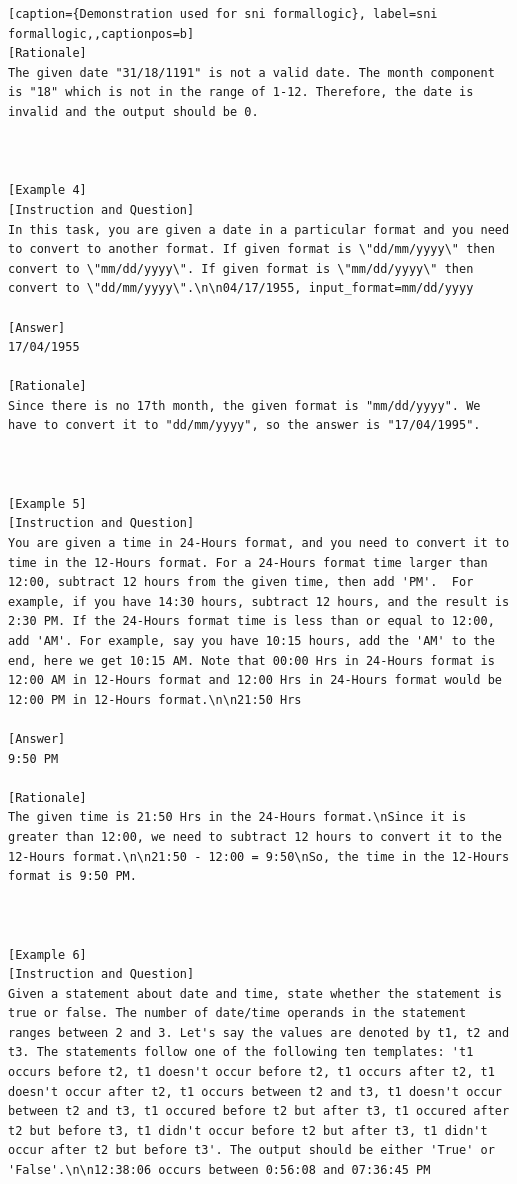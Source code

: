 \begin{lstlisting}[caption={Demonstration used for sni formallogic}, label=sni formallogic,,captionpos=b]
[Rationale]
The given date "31/18/1191" is not a valid date. The month component is "18" which is not in the range of 1-12. Therefore, the date is invalid and the output should be 0.



[Example 4]
[Instruction and Question]
In this task, you are given a date in a particular format and you need to convert to another format. If given format is \"dd/mm/yyyy\" then convert to \"mm/dd/yyyy\". If given format is \"mm/dd/yyyy\" then convert to \"dd/mm/yyyy\".\n\n04/17/1955, input_format=mm/dd/yyyy

[Answer]
17/04/1955

[Rationale]
Since there is no 17th month, the given format is "mm/dd/yyyy". We have to convert it to "dd/mm/yyyy", so the answer is "17/04/1995".



[Example 5]
[Instruction and Question]
You are given a time in 24-Hours format, and you need to convert it to time in the 12-Hours format. For a 24-Hours format time larger than 12:00, subtract 12 hours from the given time, then add 'PM'.  For example, if you have 14:30 hours, subtract 12 hours, and the result is 2:30 PM. If the 24-Hours format time is less than or equal to 12:00, add 'AM'. For example, say you have 10:15 hours, add the 'AM' to the end, here we get 10:15 AM. Note that 00:00 Hrs in 24-Hours format is 12:00 AM in 12-Hours format and 12:00 Hrs in 24-Hours format would be 12:00 PM in 12-Hours format.\n\n21:50 Hrs

[Answer]
9:50 PM

[Rationale]
The given time is 21:50 Hrs in the 24-Hours format.\nSince it is greater than 12:00, we need to subtract 12 hours to convert it to the 12-Hours format.\n\n21:50 - 12:00 = 9:50\nSo, the time in the 12-Hours format is 9:50 PM.



[Example 6]
[Instruction and Question]
Given a statement about date and time, state whether the statement is true or false. The number of date/time operands in the statement ranges between 2 and 3. Let's say the values are denoted by t1, t2 and t3. The statements follow one of the following ten templates: 't1 occurs before t2, t1 doesn't occur before t2, t1 occurs after t2, t1 doesn't occur after t2, t1 occurs between t2 and t3, t1 doesn't occur between t2 and t3, t1 occured before t2 but after t3, t1 occured after t2 but before t3, t1 didn't occur before t2 but after t3, t1 didn't occur after t2 but before t3'. The output should be either 'True' or 'False'.\n\n12:38:06 occurs between 0:56:08 and 07:36:45 PM


\end{lstlisting}
